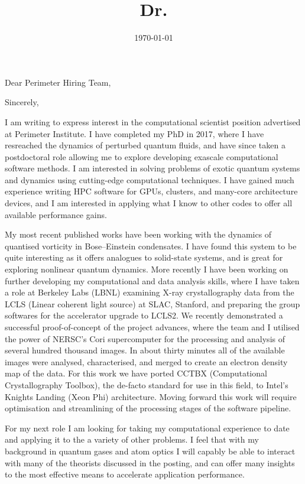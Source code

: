 \documentclass[11pt,a4paper,unicode]{moderncv}
\title{Dr.}
\begin{document}
    \date{\today} %
    \opening{Dear Perimeter Hiring Team,}
    \closing{Sincerely,}
    \makelettertitle
{
    \vspace{-0.5cm}
    I am writing to express interest in the computational scientist position advertised at Perimeter Institute. I have completed my PhD in 2017, where I have resreached the dynamics of perturbed quantum fluids, and have since taken a postdoctoral role allowing me to explore developing exascale computational software methods. I am interested in solving problems of exotic quantum systems and dynamics using cutting-edge computational techniques. I have gained much experience writing HPC software for GPUs, clusters, and many-core architecture devices, and I am interested in applying what I know to other codes to offer all available performance gains.

    My most recent published works have been working with the dynamics of quantised vorticity in Bose--Einstein condensates. I have found this system to be quite interesting as it offers analogues to solid-state systems, and is great for exploring nonlinear quantum dynamics. More recently I have been working on further developing my computational and data analysis skills, where I have taken a role at Berkeley Labs (LBNL) examining X-ray crystallography data from the LCLS (Linear coherent light source) at SLAC, Stanford, and preparing the group softwares for the accelerator upgrade to LCLS2. We recently demonstrated a successful proof-of-concept of the project advances, where the team and I utilised the power of NERSC's Cori supercomputer for the processing and analysis of several hundred thousand images. In about thirty minutes all of the available images were analysed, characterised, and merged to create an electron density map of the data. For this work we have ported CCTBX (Computational Crystallography Toolbox), the de-facto standard for use in this field, to Intel's Knights Landing (Xeon Phi) architecture. Moving forward this work will require optimisation and streamlining of the processing stages of the software pipeline.

    For my next role I am looking for taking my computational experience to date and applying it to the a variety of other problems. I feel that with my background in quantum gases and atom optics I will capably be able to interact with many of the theorists discussed in the posting, and can offer many insights to the most effective means to accelerate application performance. 

}
\end{document}

